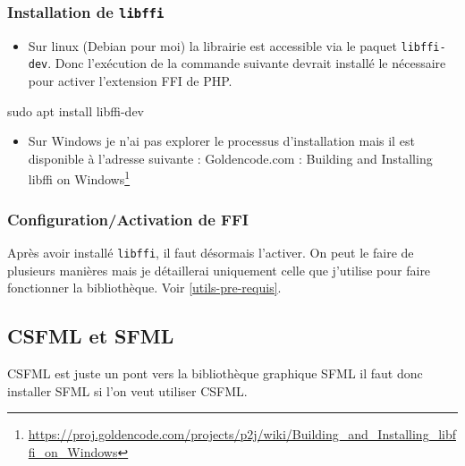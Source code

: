 \documentclass[11pt,a4paper,krantz2,11pt,oneside]{krantz}
\newenvironment{Shaded}{\begin{snugshade}}{\end{snugshade}}
\newcommand{\FunctionTok}[1]{\textcolor[rgb]{0,0,0}{#1}}
\newcommand{\NormalTok}[1]{#1}
\providecommand{\tightlist}{%
  \setlength{\itemsep}{0pt}\setlength{\parskip}{0pt}}
\renewcommand{\href}[2]{#2\footnote{\url{#1}}}
\begin{document}
\hypertarget{installation-de-libffi}{%
\subsubsection{\texorpdfstring{Installation de \texttt{libffi}}{Installation de libffi}}\label{installation-de-libffi}}

\begin{itemize}
\tightlist
\item
  Sur linux (Debian pour moi) la librairie est accessible via le paquet \texttt{libffi-dev}. Donc l'exécution de la commande suivante devrait installé le nécessaire pour activer l'extension FFI de PHP.
\end{itemize}

\begin{Shaded}
\begin{Highlighting}[]
\FunctionTok{sudo}\NormalTok{ apt install libffi-dev}
\end{Highlighting}
\end{Shaded}

\begin{itemize}
\tightlist
\item
  Sur Windows je n'ai pas explorer le processus d'installation mais il est disponible à l'adresse suivante : \href{https://proj.goldencode.com/projects/p2j/wiki/Building_and_Installing_libffi_on_Windows}{Goldencode.com : Building and Installing libffi on Windows}
\end{itemize}

\hypertarget{configurationactivation-de-ffi}{%
\subsubsection{Configuration/Activation de FFI}\label{configurationactivation-de-ffi}}

Après avoir installé \texttt{libffi}, il faut désormais l'activer. On peut le faire de plusieurs manières mais je détaillerai uniquement celle que j'utilise pour faire fonctionner la bibliothèque. Voir \ref{utils-pre-requis}.

\hypertarget{csfml-et-sfml}{%
\subsection{CSFML et SFML}\label{csfml-et-sfml}}

CSFML est juste un pont vers la bibliothèque graphique SFML il faut donc installer SFML si l'on veut utiliser CSFML.
\end{document}
